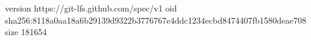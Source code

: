 version https://git-lfs.github.com/spec/v1
oid sha256:8118a0aa18a6b29139d9322b3776767e4ddc1234ecbd8474407fb1580deae708
size 181654
